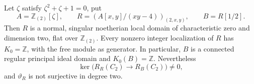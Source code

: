 \begin{theorem}
\label{C:normal_trivialK0_kernel}
Let $\zeta$ satisfy $\zeta^2+\zeta+1=0$, put
\[
 A=\mathbb Z_{(2)}[\zeta],\qquad
 R=\left(A[x,y]/(xy-4)\right)_{(2,x,y)},\qquad
 B=R[1/2].                                                \tag{C.1.N2}
\]
Then $R$ is a normal, singular noetherian local domain
of characteristic zero and dimension two, flat over $\mathbb Z_{(2)}$. Every nonzero integer
localization of $R$ has $K_0=\mathbb Z$, with the free module
as generator. In particular, $B$ is a connected regular
principal ideal domain and $K_0(B)=\mathbb Z$.
Nevertheless
\[
 \ker\bigl(R_R(C_2)\longrightarrow R_B(C_2)\bigr)\ne0,
                                                               \tag{C.1.N3}
\]
and $\vartheta_R$ is not surjective in degree two.
\end{theorem}
